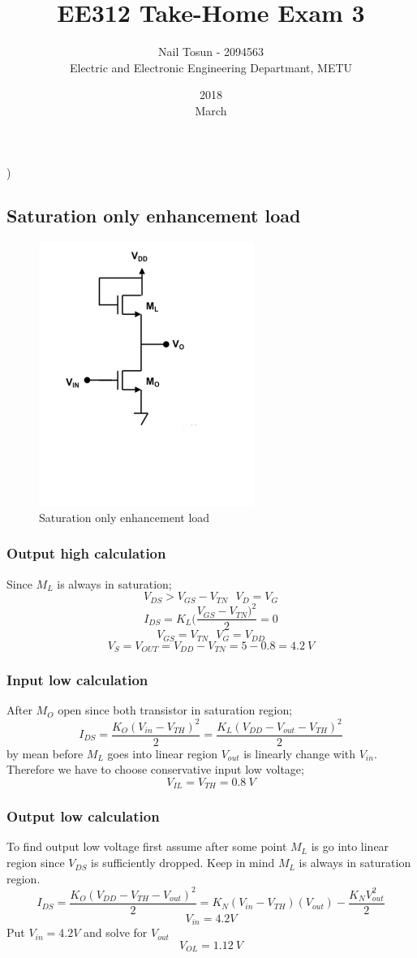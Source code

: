 \documentclass[11 pt]{article}
\title{EE312 Take-Home Exam 3}
\date{2018\\ March}
\author{Nail Tosun - 2094563 \\ Electric and Electronic Engineering Departmant, METU}
\begin{document}
)
\subsection*{Saturation only enhancement load}
\begin{figure}[H]
\centering
  \includegraphics[scale=0.7]{saturationonly}
  \caption{Saturation only enhancement load}
  \label{fig:zero}
\end{figure}
\subsubsection*{Output high calculation}
Since $M_L$ is always in saturation;
\[V_{DS}>V_{GS}-V_{TN} \>\>\> V_D=V_G\]
\[I_{DS}=K_L(\frac{ V_{GS}-V_{TN})^2}{2}=0\]
\[V_{GS}=V_{TN} \>\>\> V_G=V_{DD}\]
\[V_S=V_{OUT}=V_{DD}-V_{TN}=5-0.8=4.2 \> V\]
\subsubsection*{Input low calculation}
After $M_O$ open since both transistor in saturation region;
\[I_{DS}=\frac{K_O(V_{in}-V_{TH})^2}{2} =\frac{K_L(V_{DD}-V_{out}-V_{TH})^2}{2}\]
by mean before $M_L$ goes into linear region $V_{out}$ is linearly change with $V_{in}$. Therefore we have to choose conservative input low voltage;
\[V_{IL}=V_{TH}=0.8 \>V\]

\subsubsection*{Output low calculation}
To find output low voltage first assume after some point $M_L$ is go into linear region since $V_{DS}$ is sufficiently dropped. Keep in mind $M_L$ is always in saturation region.
\[I_{DS}=\frac{K_O(V_{DD}-V_{TH}-V_{out})^2}{2}=K_N(V_{in}-V_{TH})(V_{out})-\frac{K_N V_{out}^2}{2}\]
\[V_{in}=4.2 V\]
Put $V_{in}=4.2V$ and solve for $V_{out}$
\[V_{OL}=1.12\> V\]
\end{document}
